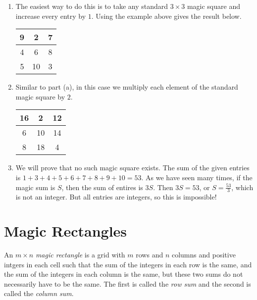 \documentclass[11pt]{article}
\begin{document}
\begin{solution}
\begin{enumerate}[label=(\alph*)]
\item The easiest way to do this is to take any standard $3 \times 3$ magic square and increase every entry by $1$.
Using the example above gives the result below.
\begin{center}
\begin{tabular}{|c|c|c|}
\hline
9 & 2 & 7 \\ \hline
4 & 6 & 8 \\ \hline
5 & 10 & 3 \\ \hline
\end{tabular}
\end{center}

\item Similar to part (a), in this case we multiply each element of the standard magic square by $2$.
\begin{center}
\begin{tabular}{|c|c|c|}
\hline
16 & 2 & 12 \\ \hline
6 & 10 & 14 \\ \hline
8 & 18 & 4 \\ \hline
\end{tabular}
\end{center}

\item We will prove that no such magic square exists. The sum of the given entries is $1+3+4+5+6+7+8+9+10=53$.
As we have seen many times, if the magic sum is $S$, then the sum of entires is $3S$. Then $3S = 53$, or 
$S = \frac{53}{3}$, which is not an integer. But all entries are integers, so this is impossible!
\end{enumerate}
\end{solution}


\section{Magic Rectangles}

\begin{definition}
An $m \times n$ \textit{magic rectangle} is a grid with $m$ rows and $n$ columns and positive intgers in each cell such that
the sum of the integers in each row is the same, and the sum of the integers in each column is the same,
but these two sums do not necessarily have to be the same.
The first is called the \textit{row sum} and the second is called the \textit{column sum}.
\end{definition}
\end{document}
